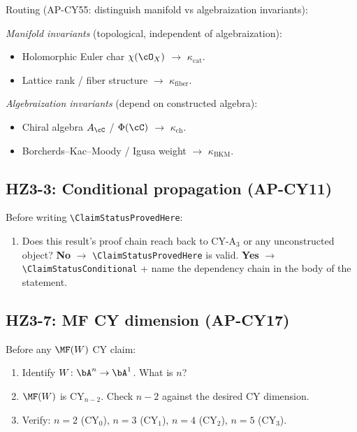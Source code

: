 \noindent
Routing (AP-CY55: distinguish manifold vs algebraization invariants):

\smallskip\noindent
\emph{Manifold invariants} (topological, independent of algebraization):
\begin{itemize}[nosep]
\item Holomorphic Euler char $\chi(\cO_X)$ $\to$
      $\kappa_{\mathrm{cat}}$.
\item Lattice rank / fiber structure $\to$
      $\kappa_{\mathrm{fiber}}$.
\end{itemize}

\noindent
\emph{Algebraization invariants} (depend on constructed algebra):
\begin{itemize}[nosep]
\item Chiral algebra $A_\cC$ / $\Phi(\cC)$ $\to$
      $\kappa_{\mathrm{ch}}$.
\item Borcherds--Kac--Moody / Igusa weight $\to$
      $\kappa_{\mathrm{BKM}}$.
\end{itemize}

\subsection{HZ3-3: Conditional propagation (AP-CY11)}

Before writing \verb|\ClaimStatusProvedHere|:
\begin{enumerate}[nosep]
\item Does this result's proof chain reach back to CY-A$_3$ or
      any unconstructed object?
      \textbf{No} $\to$ \verb|\ClaimStatusProvedHere| is valid.
      \textbf{Yes} $\to$ \verb|\ClaimStatusConditional| + name
      the dependency chain in the body of the statement.
\end{enumerate}

\subsection{HZ3-7: MF CY dimension (AP-CY17)}

Before any $\MF(W)$ CY claim:
\begin{enumerate}[nosep]
\item Identify $W \colon \bA^n \to \bA^1$.  What is $n$?
\item $\MF(W)$ is CY$_{n-2}$.  Check $n - 2$ against the desired
      CY dimension.
\item Verify: $n = 2$ (CY$_0$), $n = 3$ (CY$_1$),
      $n = 4$ (CY$_2$), $n = 5$ (CY$_3$).
\end{enumerate}

